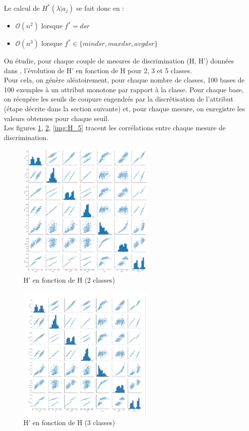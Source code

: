 \documentclass[a4paper]{article}
\begin{document}
Le calcul de $H^*(\lambda | a_j)$ se fait donc en :
\begin{itemize}
    \item $\mathcal{O}(n^2)$ lorsque $f^* = dsr$ 
    \item $\mathcal{O}(n^3)$ lorsque $f^* \in \{mindsr, maxdsr, avgdsr\}$ 
\end{itemize}

On étudie, pour chaque couple de mesures de discrimination (H, H') données dans
\cite{marsala-rank}, l'évolution de H' en fonction de H pour 2, 3 et 5 classes.
\\ Pour cela, on génère aléatoirement, pour chaque nombre de classes, 100 bases
de 100 exemples à un attribut monotone par rapport à la classe. Pour chaque
base, on récupère les seuils de coupure engendrés par la discrétisation de
l'attribut (étape décrite dans la section suivante) et, pour
chaque mesure, on enregistre les valeurs obtenues pour chaque seuil.\\ Les
figures \ref{img:H_2}, \ref{img:H_3}, \ref{img:H_5} tracent les corrélations
entre chaque mesure de discrimination. \\

\begin{figure}[H]
	\center 
	\includegraphics[width=0.6\textwidth]{images/H_2.png}
    \caption{H' en fonction de H (2 classes)}
    \label{img:H_2}
\end{figure}

\begin{figure}[H]

	\center 
	\includegraphics[width=0.6\textwidth]{images/H_3.png}
    \caption{H' en fonction de H (3 classes)}
    \label{img:H_3}
\end{figure}
\end{document}
